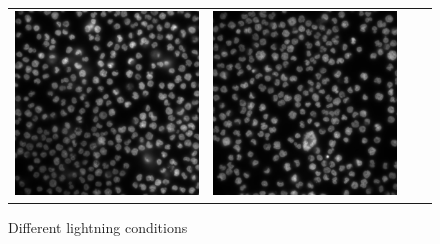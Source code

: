 \begin{figure}[H]
\begin{tabularx}{\textwidth}{YYYY}
            \includegraphics{bilder/lightning-conditions/lightning-3.png} & 
            \includegraphics{bilder/lightning-conditions/lightning-4.png}
        \end{tabularx}
    \caption{Different lightning conditions}
    \label{fig:lightning_conditions}
\end{figure}


